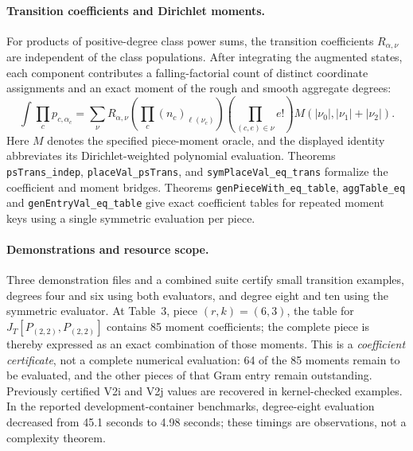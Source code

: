 \documentclass[11pt]{article}
\newcommand{\code}[1]{\texttt{#1}}
\begin{document}
\paragraph{Transition coefficients and Dirichlet moments.}
For products of positive-degree class power sums, the transition
coefficients $R_{\alpha,\nu}$ are independent of the class populations.
After integrating the augmented states, each component contributes a
falling-factorial count of distinct coordinate assignments and an exact
moment of the rough and smooth aggregate degrees:
\[
 \int\prod_c p_{c,\alpha_c}
 =\sum_{\nu}R_{\alpha,\nu}
  \left(\prod_c (n_c)_{\ell(\nu_c)}\right)
  \left(\prod_{(c,e)\in\nu} e!\right)
  M\!\left(|\nu_0|,|\nu_1|+|\nu_2|\right).
\]
Here $M$ denotes the specified piece-moment oracle, and the displayed
identity abbreviates its Dirichlet-weighted polynomial evaluation.
Theorems \code{psTrans\_indep}, \code{placeVal\_psTrans}, and
\code{symPlaceVal\_eq\_trans} formalize the coefficient and moment bridges.
Theorems \code{genPieceWith\_eq\_table}, \code{aggTable\_eq} and
\code{genEntryVal\_eq\_table} give exact coefficient tables for repeated
moment keys using a single symmetric evaluation per piece.

\paragraph{Demonstrations and resource scope.}
Three demonstration files and a combined suite certify small transition
examples, degrees four and six using both evaluators, and degree eight and
ten using the symmetric evaluator. At Table~3, piece $(r,k)=(6,3)$,
the table for $J_T[P_{(2,2)},P_{(2,2)}]$ contains 85 moment coefficients;
the complete piece is thereby expressed as an exact combination of those
moments. This is a \emph{coefficient certificate}, not a complete numerical
evaluation: 64 of the 85 moments remain to be evaluated, and the other
pieces of that Gram entry remain outstanding. Previously certified V2i and
V2j values are recovered in kernel-checked examples. In the reported
development-container benchmarks, degree-eight evaluation decreased from
45.1 seconds to 4.98 seconds; these timings are observations, not a
complexity theorem.
\end{document}
